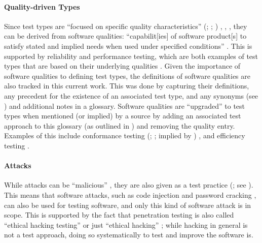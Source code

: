     \paragraph{Quality-driven Types}
    \label{qual-test}

    Since test types are ``focused on specific quality characteristics''
    \ifnotpaper
        (\citealp[p.~15]{IEEE2022}; \citeyear[p.~7]{IEEE2021};
        \citeyear[p.~473]{IEEE2017})%
    \else
        \cite[p.~15]{IEEE2022}, \cite[p.~7]{IEEE2021}, \cite[p.~473]{IEEE2017}%
    \fi, they can be derived from software qualities: ``capabilit[ies] of
    software product[s] to satisfy stated and implied needs when used under
    specified conditions'' \citep[p.~424]{IEEE2017}. This
    is supported by reliability and performance testing, which are both examples of
    test types \citep{IEEE2022, IEEE2021} that are based on their underlying
    qualities \citep[p.~18]{FentonAndPfleeger1997}.
    Given the importance of software qualities to defining test types, the
    definitions of \qualityCount{} software qualities are also tracked in this
    current work. This was done by capturing their
    definitions, any precedent for the existence of an associated test type,
    and any synonyms (see ) and additional notes in a glossary.
    Software qualities are ``upgraded'' to test types when mentioned (or
    implied) by a source by adding an associated test approach to this glossary
    (as outlined in ) and removing the quality entry. Examples
    of this include conformance testing
    \ifnotpaper
        (\citealp[p.~5-7]{SWEBOK2024}; \citealp[p.~25]{JardEtAl1999}; implied
        by \citealp[p.~93]{IEEE2017})
    \else
        \cite[p.~5-7]{SWEBOK2024}, \cite[p.~25]{JardEtAl1999}
    \fi and efficiency testing \citep[p.~44]{Kam2008}.

    \paragraph{Attacks}
    \label{attacks}
    While attacks can be ``malicious'' \citep[p.~7]{IEEE2017}, they are also
    given as a test practice (\citeyear[p.~34]{IEEE2022}; see ).
    This means that software attacks, such as code injection and password
    cracking \citepISTQB{}, can also be used for testing software, and only
    this kind of software attack is in scope. This is supported by the fact
    that penetration testing is also called ``ethical hacking testing''
    \citep[p.~13-4]{SWEBOK2024} or just ``ethical hacking''
    \citep[p.~28]{Gerrard2000b}; while hacking in general is not a test
    approach, doing so systematically to test and improve the software is.


